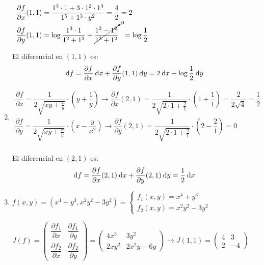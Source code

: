 \begin{enumerate}[label=\c olor{red}\textbf{\arabic*)}, leftmargin=*]
$\begin{array}{l}
\dfrac{\partial f}{\partial x}(1,1)=\dfrac{1^{3}\cdot1+3\cdot1^{2}\cdot1^{3}}{1^{5}+1^{3}\cdot y^{2}}=\dfrac{4}{2}=2\\
\dfrac{\partial f}{\partial y}(1,1)=\log\dfrac{1^{3}\cdot 1}{1^{2}+1^{2}}+\cancelto{0}{\dfrac{1^{2}-1^{2}}{1^{2}+1^{2}}}~~=\log\dfrac{1}{2}
\end{array}$

El diferencial en $(1,1)$ es: \[ \mathrm{d}f=\dfrac{\partial f}{\partial x}\:\mathrm{d}x+\dfrac{\partial f}{\partial y}(1,1)\:\mathrm{d}y=2\:\mathrm{d}x+\log\dfrac{1}{2}\:\mathrm{d}y \]

\item {}

$\begin{array}{l}
\dfrac{\partial f}{\partial x}=\dfrac{1}{2\sqrt{xy+\frac{x}{y}}}\cdot\left(y+\dfrac{1}{y}\right)\longrightarrow\dfrac{\partial f}{\partial x}(2,1)=\dfrac{1}{2\sqrt{2\cdot 1+\frac{2}{1}}}\cdot\left(1+\dfrac{1}{1}\right)=\dfrac{2}{2\sqrt{4}}=\dfrac{1}{2}\\
\dfrac{\partial f}{\partial y}=\dfrac{1}{2\sqrt{xy+\frac{x}{y}}}\cdot\left(x-\dfrac{y}{x^{2}}\right)\longrightarrow\dfrac{\partial f}{\partial y}(2,1)=\dfrac{1}{2\sqrt{2\cdot1+\frac{2}{1}}}\cdot\left(2-\dfrac{2}{1}\right)=0\\
\end{array}$

El diferencial en $(2,1)$ es: \[ \mathrm{d}f=\dfrac{\partial f}{\partial x}(2,1)\:\mathrm{d}x+\dfrac{\partial f}{\partial y}(2,1)\:\mathrm{d}y=\dfrac{1}{2}\:\mathrm{d}x \]

\item {}

$f(x,y)=\left(x^{4}+y^{3},x^{2}y^{2}-3y^{2}\right)=\begin{cases}
f_1(x,y)=x^{4}+y^{3}\\
f_2(x,y)=x^{2}y^{2}-3y^{2}
\end{cases}$

$J(f)=\begin{pmatrix}
\dfrac{\partial f_1}{\partial x} & \dfrac{\partial f_1}{\partial y} \\
\dfrac{\partial f_{2}}{\partial x} & \dfrac{\partial f_2}{\partial y}
\end{pmatrix}=\begin{pmatrix}
4x^{3} & 3y^2 \\
 2xy^{2} & 2x^{2}y-6y
\end{pmatrix}\longrightarrow J(1,1)=\begin{pmatrix}
4 & 3 \\
2 & -4
\end{pmatrix}$


\end{enumerate}
